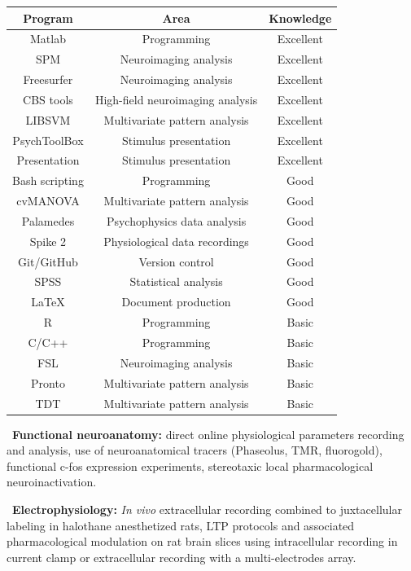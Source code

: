 \documentclass[a4paper,12pt,oneside]{letter}
\begin{document}
{\begin{center}
\begin{tabular}[c]{|c|c|c|}
\hline\hline
Program & Area & Knowledge \\
\hline
Matlab & Programming & Excellent \\ 
SPM & Neuroimaging analysis & Excellent \\
Freesurfer & Neuroimaging analysis & Excellent \\
CBS tools & High-field neuroimaging analysis & Excellent \\
LIBSVM & Multivariate pattern analysis & Excellent \\
PsychToolBox & Stimulus presentation & Excellent \\
Presentation & Stimulus presentation & Excellent \\
Bash scripting & Programming & Good \\
cvMANOVA & Multivariate pattern analysis & Good \\
Palamedes & Psychophysics data analysis & Good \\
Spike 2 & Physiological data recordings & Good \\
Git/GitHub & Version control & Good \\
SPSS & Statistical analysis & Good \\
\LaTeX & Document production & Good \\
R & Programming & Basic \\
C/C++ & Programming & Basic \\
FSL & Neuroimaging analysis & Basic \\
Pronto & Multivariate pattern analysis & Basic \\
TDT & Multivariate pattern analysis & Basic \\
\hline\hline
\end{tabular} 
\end{center}

\textbullet~\textbf{Functional neuroanatomy:} direct online physiological parameters recording and analysis, use of neuroanatomical tracers (Phaseolus, TMR, fluorogold), functional c-fos expression experiments, stereotaxic local pharmacological neuroinactivation. 

\textbullet~\textbf{Electrophysiology:} \textit{In vivo} extracellular recording combined to juxtacellular labeling in halothane anesthetized rats, LTP protocols and associated pharmacological modulation on rat brain slices using intracellular recording in current clamp or extracellular recording with a multi-electrodes array. 

}
\end{document}
